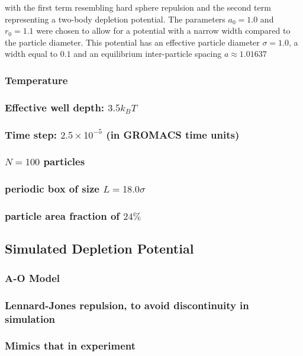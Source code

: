 \documentclass{umthesis}
\begin{document}
with the first term resembling hard sphere repulsion and the second term  representing a two-body depletion potential. The parameters $a_0=1.0$ and $r_0=1.1$ were chosen to allow for  a potential with a narrow width compared to the particle diameter. This potential has an effective particle diameter $\sigma=1.0$,  a width equal to $0.1$ and an equilibrium inter-particle spacing $a \approx 1.01637$
\subsubsection{Temperature}
\label{sec-1.3.3.4}
\subsubsection{Effective well depth: $3.5 k_B T$}
\label{sec-1.3.3.5}
\subsubsection{Time step: $2.5 \times 10^{-5}$ (in GROMACS time units)}
\label{sec-1.3.3.6}
\subsubsection{$N=100$ particles}
\label{sec-1.3.3.7}
\subsubsection{periodic box of size $L = 18.0 \sigma$}
\label{sec-1.3.3.8}
\subsubsection{particle area fraction of $24\%$}
\label{sec-1.3.3.9}
\subsection{Simulated Depletion Potential}
\label{sec-1.3.4}
\subsubsection{A-O Model}
\label{sec-1.3.4.1}
\subsubsection{Lennard-Jones repulsion, to avoid discontinuity in simulation}
\label{sec-1.3.4.2}
\subsubsection{Mimics that in experiment}
\label{sec-1.3.4.3}
\end{document}
